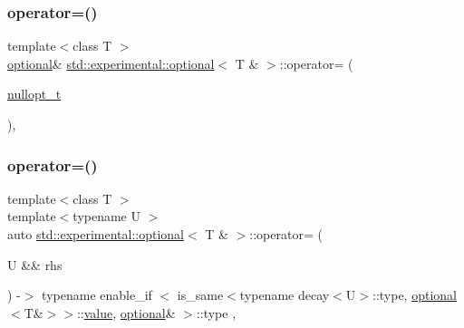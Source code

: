 \mbox{\label{classstd_1_1experimental_1_1optional_3_01_t_01_6_01_4_af8f513f05e0710ae389c77721e02c4b8}} 
\subsubsection{\texorpdfstring{operator=()}{operator=()}\hspace{0.1cm}{\footnotesize\ttfamily [1/3]}}
{\footnotesize\ttfamily template$<$class T $>$ \\
\mbox{\hyperlink{classstd_1_1experimental_1_1optional}{optional}}\& \mbox{\hyperlink{classstd_1_1experimental_1_1optional}{std\+::experimental\+::optional}}$<$ T \& $>$\+::operator= (\begin{DoxyParamCaption}\item[{\mbox{\hyperlink{structstd_1_1experimental_1_1nullopt__t}{nullopt\+\_\+t}}}]{ }\end{DoxyParamCaption})\hspace{0.3cm}{\ttfamily [inline]}, {\ttfamily [noexcept]}}

\mbox{\label{classstd_1_1experimental_1_1optional_3_01_t_01_6_01_4_a0ccf7e1456d6cdfa46a0a0a6de2f88ba}} 
\subsubsection{\texorpdfstring{operator=()}{operator=()}\hspace{0.1cm}{\footnotesize\ttfamily [2/3]}}
{\footnotesize\ttfamily template$<$class T $>$ \\
template$<$typename U $>$ \\
auto \mbox{\hyperlink{classstd_1_1experimental_1_1optional}{std\+::experimental\+::optional}}$<$ T \& $>$\+::operator= (\begin{DoxyParamCaption}\item[{U \&\&}]{rhs }\end{DoxyParamCaption}) -\/$>$ typename enable\+\_\+if
                $<$
                    is\+\_\+same$<$typename decay$<$U$>$\+::type, \mbox{\hyperlink{classstd_1_1experimental_1_1optional}{optional}}$<$T\&$>$$>$\+::\mbox{\hyperlink{classstd_1_1experimental_1_1optional_ad1277f09c288255dfe102b72e7107be6}{value}},
                    \mbox{\hyperlink{classstd_1_1experimental_1_1optional}{optional}}\&
                $>$\+::type
            \hspace{0.3cm}{\ttfamily [inline]}, {\ttfamily [noexcept]}}

